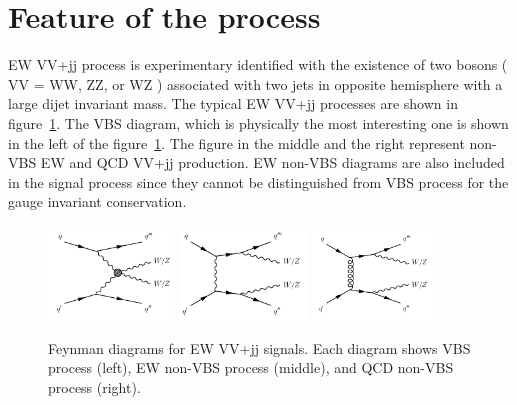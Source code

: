 \section{Feature of the process}
EW VV+jj process is experimentary identified with the existence of two bosons ( VV = WW, ZZ, or WZ ) associated with two jets in opposite hemisphere with a large dijet invariant mass.
The typical EW VV+jj processes are shown in figure~\ref{fig:feynmanEWVVjj}.
The VBS diagram, which is physically the most interesting one is shown in the left of the figure~\ref{fig:feynmanEWVVjj}. The figure in the middle and the right represent non-VBS EW and QCD VV+jj production. EW non-VBS diagrams are also included in the signal process since they cannot be distinguished from VBS process for the gauge invariant conservation. 
\begin{figure}[H]
\begin{center}
 \includegraphics[width=0.3\textwidth,keepaspectratio]{figures/EWVVjj_a.png}
 \includegraphics[width=0.3\textwidth,keepaspectratio]{figures/EWVVjj_b.png}
 \includegraphics[width=0.3\textwidth,keepaspectratio]{figures/EWVVjj_c.png}

\caption[f]{
Feynman diagrams for EW VV+jj signals. Each diagram shows VBS process (left), EW non-VBS process (middle), and QCD non-VBS process (right).
}
\label{fig:feynmanEWVVjj}
\end{center}
\end{figure}



